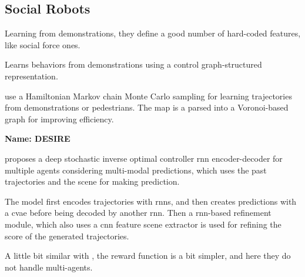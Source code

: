 \subsection{Social Robots}\label{subsec: social robots}


\cite{vasquez2014inverse} Learning from demonstrations, they define a good number of hard-coded features, like social force ones.



\cite{okal2016learning} Learns behaviors from demonstrations using a control graph-structured representation.



\cite{kretzschmar2016socially} use a Hamiltonian Markov chain Monte Carlo sampling for learning trajectories from demonstrations or pedestrians.
%
The map is a parsed into a Voronoi-based graph for improving efficiency.




\textbf{Name: DESIRE}

\cite{lee2017desire} proposes a deep stochastic inverse optimal controller \gls{rnn} encoder-decoder for multiple agents considering multi-modal predictions, which uses the past trajectories and the scene for making prediction.

The model first encodes trajectories with \glspl{rnn}, and then creates predictions with a \gls{cvae} before being decoded by another \gls{rnn}. 
%
Then a \gls{rnn}-based refinement module, which also uses a \gls{cnn} feature scene extractor is used for refining the score of the generated trajectories.



\cite{chen2017decentralized} A little bit similar with \cite{chen2017socially}, the reward function  is a bit simpler, and here they do not handle multi-agents. 

